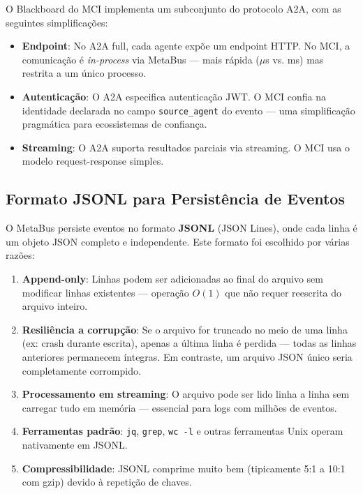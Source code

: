 O Blackboard do MCI implementa um subconjunto do protocolo A2A, com as seguintes simplificações:

\begin{itemize}
    \item \textbf{Endpoint}: No A2A full, cada agente expõe um endpoint HTTP. No MCI, a comunicação é \textit{in-process} via MetaBus — mais rápida ($\mu$s vs. ms) mas restrita a um único processo.
    \item \textbf{Autenticação}: O A2A especifica autenticação JWT. O MCI confia na identidade declarada no campo \texttt{source\_agent} do evento — uma simplificação pragmática para ecossistemas de confiança.
    \item \textbf{Streaming}: O A2A suporta resultados parciais via streaming. O MCI usa o modelo request-response simples.
\end{itemize}

\subsection{Formato JSONL para Persistência de Eventos}

O MetaBus persiste eventos no formato \textbf{JSONL} (JSON Lines), onde cada linha é um objeto JSON completo e independente. Este formato foi escolhido por várias razões:

\begin{enumerate}
    \item \textbf{Append-only}: Linhas podem ser adicionadas ao final do arquivo sem modificar linhas existentes — operação $O(1)$ que não requer reescrita do arquivo inteiro.
    
    \item \textbf{Resiliência a corrupção}: Se o arquivo for truncado no meio de uma linha (ex: crash durante escrita), apenas a última linha é perdida — todas as linhas anteriores permanecem íntegras. Em contraste, um arquivo JSON único seria completamente corrompido.
    
    \item \textbf{Processamento em streaming}: O arquivo pode ser lido linha a linha sem carregar tudo em memória — essencial para logs com milhões de eventos.
    
    \item \textbf{Ferramentas padrão}: \texttt{jq}, \texttt{grep}, \texttt{wc -l} e outras ferramentas Unix operam nativamente em JSONL.
    
    \item \textbf{Compressibilidade}: JSONL comprime muito bem (tipicamente 5:1 a 10:1 com gzip) devido à repetição de chaves.
\end{enumerate}

